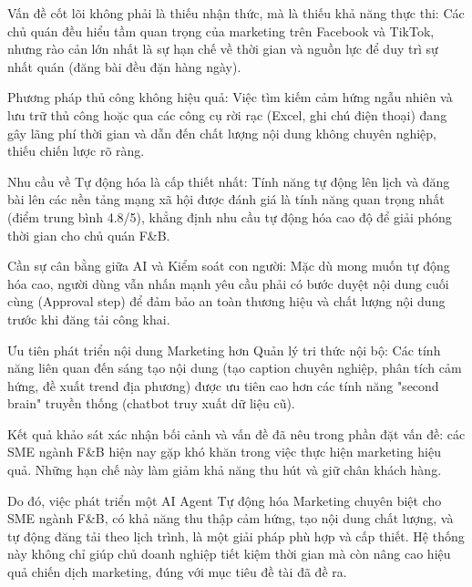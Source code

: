 Vấn đề cốt lõi không phải là thiếu nhận thức, mà là thiếu khả năng thực
thi: Các chủ quán đều hiểu tầm quan trọng của marketing trên Facebook và
TikTok, nhưng rào cản lớn nhất là sự hạn chế về thời gian và nguồn lực
để duy trì sự nhất quán (đăng bài đều đặn hàng ngày).

Phương pháp thủ công không hiệu quả: Việc tìm kiếm cảm hứng ngẫu nhiên
và lưu trữ thủ công hoặc qua các công cụ rời rạc (Excel, ghi chú điện
thoại) đang gây lãng phí thời gian và dẫn đến chất lượng nội dung không
chuyên nghiệp, thiếu chiến lược rõ ràng.

Nhu cầu về Tự động hóa là cấp thiết nhất: Tính năng tự động lên lịch và
đăng bài lên các nền tảng mạng xã hội được đánh giá là tính năng quan
trọng nhất (điểm trung bình 4.8/5), khẳng định nhu cầu tự động hóa cao
độ để giải phóng thời gian cho chủ quán F\&B.

Cần sự cân bằng giữa AI và Kiểm soát con người: Mặc dù mong muốn tự động
hóa cao, người dùng vẫn nhấn mạnh yêu cầu phải có bước duyệt nội dung
cuối cùng (Approval step) để đảm bảo an toàn thương hiệu và chất lượng
nội dung trước khi đăng tải công khai.

Ưu tiên phát triển nội dung Marketing hơn Quản lý tri thức nội bộ: Các
tính năng liên quan đến sáng tạo nội dung (tạo caption chuyên nghiệp,
phân tích cảm hứng, đề xuất trend địa phương) được ưu tiên cao hơn các
tính năng "second brain" truyền thống (chatbot truy xuất dữ liệu cũ).

Kết quả khảo sát xác nhận bối cảnh và vấn đề đã nêu trong phần đặt vấn
đề: các SME ngành F\&B hiện nay gặp khó khăn trong việc thực hiện
marketing hiệu quả. Những hạn chế này làm giảm khả năng thu hút và giữ
chân khách hàng.

Do đó, việc phát triển một AI Agent Tự động hóa Marketing chuyên biệt
cho SME ngành F\&B, có khả năng thu thập cảm hứng, tạo nội dung chất
lượng, và tự động đăng tải theo lịch trình, là một giải pháp phù hợp và
cấp thiết. Hệ thống này không chỉ giúp chủ doanh nghiệp tiết kiệm thời
gian mà còn nâng cao hiệu quả chiến dịch marketing, đúng với mục tiêu đề
tài đã đề ra.
